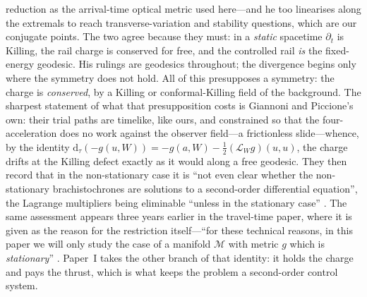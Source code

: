 \documentclass[12pt]{iopart}
\theoremstyle{plain}
\theoremstyle{definition}
\theoremstyle{remark}
\newcommand{\dd}{\mathrm{d}}
\begin{document}
reduction as the arrival-time optical metric used here---and he too linearises along
the extremals to reach transverse-variation and stability questions, which are our
conjugate points. The two agree because they must: in a \emph{static} spacetime
$\partial_t$ is Killing, the rail charge is conserved for free, and the controlled
rail \emph{is} the fixed-energy geodesic. His rulings are geodesics throughout; the
divergence begins only where the symmetry does not hold. All of this presupposes a symmetry: the charge is \emph{conserved},
by a Killing or conformal-Killing field of the background. The sharpest statement
of what that presupposition costs is Giannoni and Piccione's own: their trial paths
are timelike, like ours, and constrained so that the four-acceleration does no work
against the observer field---a frictionless slide---whence, by the identity
$\dd_\tau(-g(u,W))=-g(a,W)-\tfrac12(\mathcal L_Wg)(u,u)$, the charge drifts at the
Killing defect exactly as it would along a free geodesic. They then record that in
the non-stationary case it is ``not even clear whether the non-stationary
brachistochrones are solutions to a second-order differential equation'', the
Lagrange multipliers being eliminable ``unless in the stationary case''
\cite[\S1]{GiannoniPiccione2002}. The same assessment appears three years earlier
in the travel-time paper, where it is given as the reason for the restriction
itself---``for these technical reasons, in this paper we will only study the case
of a manifold $\mathcal M$ with metric $g$ which is \emph{stationary}''
\cite[\S1]{GiannoniPiccioneTausk2002}. Paper~I takes the other branch of that identity:
it holds the charge and pays the thrust, which is what keeps the problem a
second-order control system.
\end{document}
